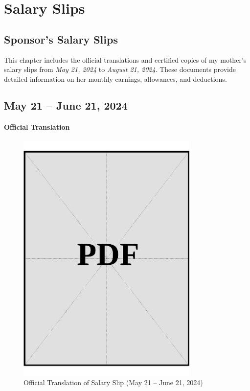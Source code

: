 \chapter{Salary Slips}\label{sec:salary-slips}

\section{Sponsor's Salary Slips}\label{sec:sponsor-salary-slips}
\noindent
This chapter includes the official translations and certified copies of my mother's salary slips from \textit{May 21, 2024} to \textit{August 21, 2024}. These documents provide detailed information on her monthly earnings, allowances, and deductions.

\clearpage

\section*{May 21 – June 21, 2024}

\subsubsection*{Official Translation}
\vspace*{\fill}
\begin{figure}[h]
    \centering
    \includegraphics[page=1, width=0.8\textwidth]{../docs/sponsor/funds/salary-slips/month-1/official-translations.pdf}
    \caption{Official Translation of Salary Slip (May 21 – June 21, 2024)}
    \label{fig:month-1-trans}
\end{figure}
\vspace*{\fill}

